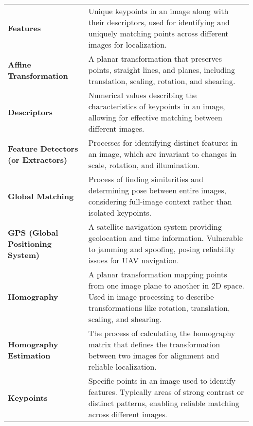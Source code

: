 \begingroup
\renewcommand{\arraystretch}{1.2}
\begin{tabularx}{\textwidth}{@{}p{2.5cm}L}

    \textbf{Features} & 
    Unique keypoints in an image along with their descriptors, used for identifying and uniquely matching points across different images for localization. \\
    
    \textbf{Affine Transformation} & 
    A planar transformation that preserves points, straight lines, and planes, including translation, scaling, rotation, and shearing. \\


    \textbf{Descriptors} & 
    Numerical values describing the characteristics of keypoints in an image, allowing for effective matching between different images. \\

    \textbf{Feature Detectors (or Extractors)} & 
    Processes for identifying distinct features in an image, which are invariant to changes in scale, rotation, and illumination. \\



    \textbf{Global Matching} & 
    Process of finding similarities and determining pose between entire images, considering full-image context rather than isolated keypoints. \\

    \textbf{GPS (Global Positioning System)} & 
    A satellite navigation system providing geolocation and time information. Vulnerable to jamming and spoofing, posing reliability issues for UAV navigation. \\

    \textbf{Homography} & 
    A planar transformation mapping points from one image plane to another in 2D space. Used in image processing to describe transformations like rotation, translation, scaling, and shearing. \\

    \textbf{Homography Estimation} & 
    The process of calculating the homography matrix that defines the transformation between two images for alignment and reliable localization. \\

    \textbf{Keypoints} & 
    Specific points in an image used to identify features. Typically areas of strong contrast or distinct patterns, enabling reliable matching across different images. \\


\end{tabularx}
